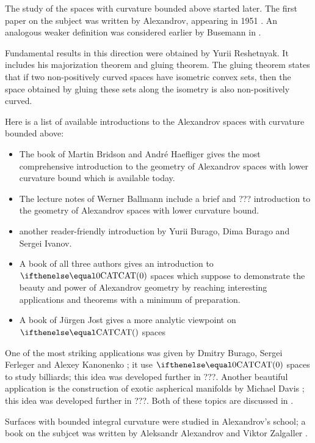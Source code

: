 The study of the spaces with curvature bounded above started later.
The first paper on the subject was written by Alexandrov, appearing in 1951 \cite{alexandrov:strong-angle}.
An analogous weaker definition was considered earlier by Busemann in \cite{busemann-CBA}.

Fundamental results in this direction were obtained by Yurii Reshetnyak.
It includes his majorization theorem and gluing theorem.
The gluing theorem states that if two non-positively curved spaces have isometric convex sets, then the space obtained by gluing these sets along the isometry is also non-positively curved.

Here is a list of available introductions to the Alexandrov spaces with curvature bounded above: 
\begin{itemize}
\item The book of Martin Bridson and André Haefliger \cite{BH} gives the most comprehensive introduction to the geometry of Alexandrov spaces with lower curvature bound which is available today. 
\item The lecture notes of Werner Ballmann \cite{ballmann:lectures} include a brief and ??? introduction to the geometry of Alexandrov spaces with lower curvature bound.
\item \cite[Chapter 9]{BBI} another reader-friendly introduction by Yurii Burago, Dima Burago and Sergei Ivanov.
\item A book of all three authors \cite{AKP-CAT} gives an introduction to $\CAT{0}$ spaces which suppose to demonstrate the beauty and power of Alexandrov geometry by reaching interesting applications and theorems with a minimum of preparation.
\item A book of J\"{u}rgen Jost \cite{jost} gives a more analytic viewpoint on $\CAT{}$ spaces
\end{itemize}

One of the most striking applications was given by Dmitry Burago, Sergei Ferleger and Alexey Kanonenko \cite{BFK};
it use $\CAT0$ spaces to study billiards; this idea was developed further in ???. 
Another beautiful application is the construction of exotic aspherical manifolds by Michael Davis \cite{davis:aspherical}; this idea was developed further in ???.
Both of these topics are discussed in \cite{AKP-CAT}.

Surfaces with bounded integral curvature were studied in Alexandrov's school;
a book on the subjcet was written by Aleksandr Alexandrov and Viktor Zalgaller \cite{aleksandrov-zalgaller}.

